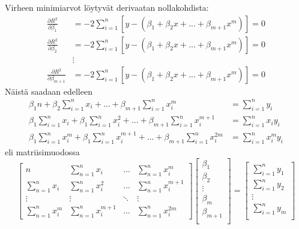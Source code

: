 \documentclass[12pt,a4paper,titlepage]{article}
\begin{document}
Virheen minimiarvot löytyvät derivaatan nollakohdista:
\begin{align*}
	\frac{\partial R^2}{\partial \beta_1} &= -2\sum\limits_{i=1}^n[y-(\beta_1+\beta_2x+...+\beta_{m+1}x^m)]=0 \\
	\frac{\partial R^2}{\partial \beta_2} &= -2\sum\limits_{i=1}^n[y-(\beta_1+\beta_2x+...+\beta_{m+1}x^m)]=0 \\
	&\vdots  \\
	\frac{\partial R^2}{\partial \beta_{m+1}} &= -2\sum\limits_{i=1}^n[y-(\beta_1+\beta_2x+...+\beta_{m+1}x^m)]=0
\end{align*}
Näistä saadaan edelleen 
\begin{align*}
	\beta_1 n+\beta_2\sum\limits_{i=1}^n x_i+...+\beta_{m+1} \sum\limits_{i=1}^n x_i^m &= \sum\limits_{i=1}^n y_i \\
	\beta_1\sum\limits_{i=1}^nx_i+\beta_1\sum\limits_{i=1}^nx_i^2+...+\beta_{m+1}\sum\limits_{i=1}^nx_i^{m+1} &= \sum\limits_{i=1}^n x_iy_i  \\
	\beta_1\sum\limits_{i=1}^nx_i^{m}+\beta_1\sum\limits_{i=1}^nx_i^{m+1}+...+\beta_{m+1}\sum\limits_{i=1}^nx_i^{2m} &= \sum\limits_{i=1}^n x_i^{m}y_i
\end{align*}
eli matriisimuodossa
\begin{equation*}
	\begin{bmatrix}
		n & \sum\limits_{n=1}^{n} x_i & ... & \sum\limits_{n=1}^{n} x_i^{m} \\
		\sum\limits_{n=1}^{n} x_i & \sum\limits_{n=1}^{n} x_i^2 & ... & \sum\limits_{n=1}^{n} x_i^{m+1} \\
		\vdots & \vdots & \ddots  & \vdots \\
		\sum\limits_{n=1}^{n} x_i^{m} & \sum\limits_{n=1}^{n} x_i^{m+1} & ... & \sum\limits_{n=1}^{n} x_i^{2m}
	\end{bmatrix}
	\begin{bmatrix}
		\beta_1 \\
		\beta_2 \\
		\vdots \\
		\beta_{m} \\
		\beta_{m+1} \\
	\end{bmatrix}
	=
	\begin{bmatrix}
		\sum\limits_{i=1}^n y_1 \\
		\sum\limits_{i=1}^n y_2 \\
		\vdots \\
		\sum\limits_{i=1}^n y_{m} \\
	\end{bmatrix}
\end{equation*}
\end{document}
